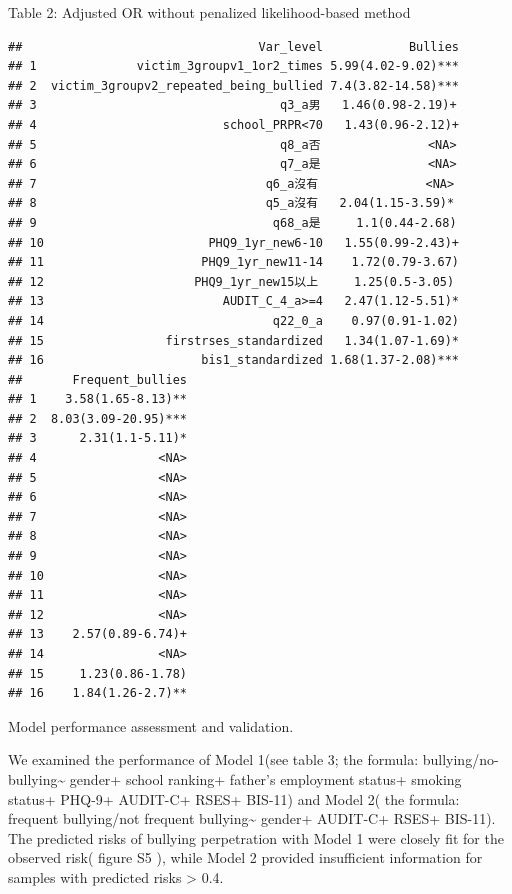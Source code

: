 \documentclass[
]{article}
\newenvironment{Shaded}{\begin{snugshade}}{\end{snugshade}}
\newcommand{\DataTypeTok}[1]{\textcolor[rgb]{0.13,0.29,0.53}{#1}}
\newcommand{\DecValTok}[1]{\textcolor[rgb]{0.00,0.00,0.81}{#1}}
\newcommand{\KeywordTok}[1]{\textcolor[rgb]{0.13,0.29,0.53}{\textbf{#1}}}
\newcommand{\NormalTok}[1]{#1}
\newcommand{\OperatorTok}[1]{\textcolor[rgb]{0.81,0.36,0.00}{\textbf{#1}}}
\begin{document}
Table 2: Adjusted OR without penalized likelihood-based method

\begin{Shaded}
\end{Shaded}

\begin{verbatim}
##                                 Var_level            Bullies
## 1              victim_3groupv1_1or2_times 5.99(4.02-9.02)***
## 2  victim_3groupv2_repeated_being_bullied 7.4(3.82-14.58)***
## 3                                  q3_a男   1.46(0.98-2.19)+
## 4                          school_PRPR<70   1.43(0.96-2.12)+
## 5                                  q8_a否               <NA>
## 6                                  q7_a是               <NA>
## 7                                q6_a沒有               <NA>
## 8                                q5_a沒有   2.04(1.15-3.59)*
## 9                                 q68_a是     1.1(0.44-2.68)
## 10                       PHQ9_1yr_new6-10   1.55(0.99-2.43)+
## 11                      PHQ9_1yr_new11-14    1.72(0.79-3.67)
## 12                     PHQ9_1yr_new15以上     1.25(0.5-3.05)
## 13                         AUDIT_C_4_a>=4   2.47(1.12-5.51)*
## 14                                q22_0_a    0.97(0.91-1.02)
## 15                 firstrses_standardized   1.34(1.07-1.69)*
## 16                      bis1_standardized 1.68(1.37-2.08)***
##       Frequent_bullies
## 1    3.58(1.65-8.13)**
## 2  8.03(3.09-20.95)***
## 3      2.31(1.1-5.11)*
## 4                 <NA>
## 5                 <NA>
## 6                 <NA>
## 7                 <NA>
## 8                 <NA>
## 9                 <NA>
## 10                <NA>
## 11                <NA>
## 12                <NA>
## 13    2.57(0.89-6.74)+
## 14                <NA>
## 15     1.23(0.86-1.78)
## 16    1.84(1.26-2.7)**
\end{verbatim}

Model performance assessment and validation.

We examined the performance of Model 1(see table 3; the formula:
bullying/no-bullying\textasciitilde{} gender+ school ranking+ father's
employment status+ smoking status+ PHQ-9+ AUDIT-C+ RSES+ BIS-11) and
Model 2( the formula: frequent bullying/not frequent
bullying\textasciitilde{} gender+ AUDIT-C+ RSES+ BIS-11). The predicted
risks of bullying perpetration with Model 1 were closely fit for the
observed risk( figure S5 ), while Model 2 provided insufficient
information for samples with predicted risks \textgreater{} 0.4.
\end{document}
